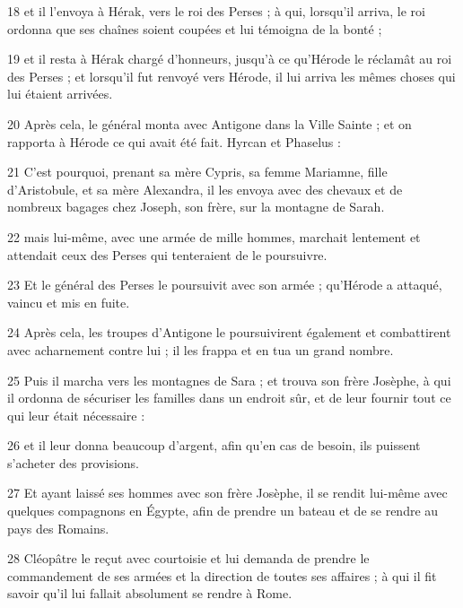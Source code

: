 \par 18 et il l'envoya à Hérak, vers le roi des Perses ; à qui, lorsqu'il arriva, le roi ordonna que ses chaînes soient coupées et lui témoigna de la bonté ;

\par 19 et il resta à Hérak chargé d'honneurs, jusqu'à ce qu'Hérode le réclamât au roi des Perses ; et lorsqu'il fut renvoyé vers Hérode, il lui arriva les mêmes choses qui lui étaient arrivées.

\par 20 Après cela, le général monta avec Antigone dans la Ville Sainte ; et on rapporta à Hérode ce qui avait été fait. Hyrcan et Phaselus :

\par 21 C'est pourquoi, prenant sa mère Cypris, sa femme Mariamne, fille d'Aristobule, et sa mère Alexandra, il les envoya avec des chevaux et de nombreux bagages chez Joseph, son frère, sur la montagne de Sarah.

\par 22 mais lui-même, avec une armée de mille hommes, marchait lentement et attendait ceux des Perses qui tenteraient de le poursuivre.

\par 23 Et le général des Perses le poursuivit avec son armée ; qu'Hérode a attaqué, vaincu et mis en fuite.

\par 24 Après cela, les troupes d'Antigone le poursuivirent également et combattirent avec acharnement contre lui ; il les frappa et en tua un grand nombre.

\par 25 Puis il marcha vers les montagnes de Sara ; et trouva son frère Josèphe, à qui il ordonna de sécuriser les familles dans un endroit sûr, et de leur fournir tout ce qui leur était nécessaire :

\par 26 et il leur donna beaucoup d'argent, afin qu'en cas de besoin, ils puissent s'acheter des provisions.

\par 27 Et ayant laissé ses hommes avec son frère Josèphe, il se rendit lui-même avec quelques compagnons en Égypte, afin de prendre un bateau et de se rendre au pays des Romains.

\par 28 Cléopâtre le reçut avec courtoisie et lui demanda de prendre le commandement de ses armées et la direction de toutes ses affaires ; à qui il fit savoir qu'il lui fallait absolument se rendre à Rome.

